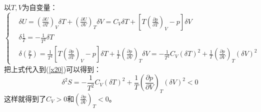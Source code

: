 \documentclass[12pt]{article}
\begin{document}
以$T,V$为自变量：
\begin{equation}
	\left\{\begin{split}
		&\delta U=(\frac{\partial U}{\partial T})_V\delta T+(\frac{\partial U}{\partial V})_T\delta V=C_V\delta T+[T(\frac{\partial p}{\partial T})_V-p]\delta V\\
		&\delta\frac{1}{T}=-\frac{1}{T^2}\delta T\\
		&\delta(\frac{p}{T})=\frac{1}{T^2}[T(\frac{\partial p}{\partial T})_V-p]\delta T+\frac{1}{T}(\frac{\partial p}{\partial V})_T\delta V=-\frac{1}{T^2}C_V(\delta T)^2+\frac{1}{T}(\frac{\partial p}{\partial V})_T(\delta V)^2
		\end{split}\right.
	\label{x19}
\end{equation}
把上式代入到(\ref{x20})可以得到：
\begin{equation}
	\delta^2S=-\frac{1}{T^2}C_V(\delta T)^2+\frac{1}{T}(\frac{\partial p}{\partial V})_T(\delta V)^2<0
\end{equation}
这样就得到了$C_V>0$和$(\frac{\partial p}{\partial V})_T<0$。
\end{document}

